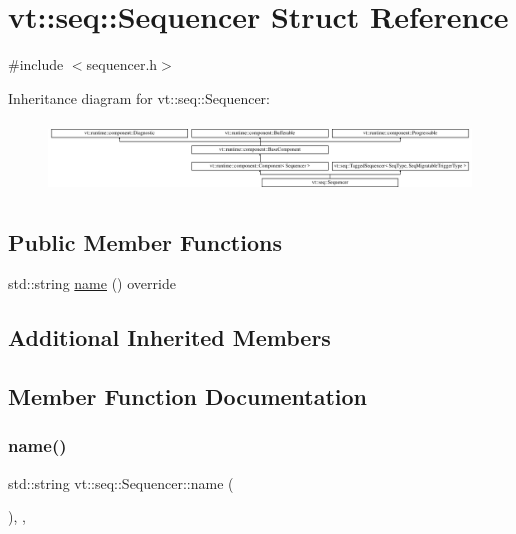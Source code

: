 \hypertarget{structvt_1_1seq_1_1_sequencer}{}\section{vt\+:\+:seq\+:\+:Sequencer Struct Reference}
\label{structvt_1_1seq_1_1_sequencer}


{\ttfamily \#include $<$sequencer.\+h$>$}

Inheritance diagram for vt\+:\+:seq\+:\+:Sequencer\+:\begin{figure}[H]
\begin{center}
\leavevmode
\includegraphics[height=1.885522cm]{structvt_1_1seq_1_1_sequencer}
\end{center}
\end{figure}
\subsection*{Public Member Functions}
\begin{DoxyCompactItemize}
\item 
std\+::string \hyperlink{structvt_1_1seq_1_1_sequencer_a18cbaabd9f1c5bf8d2f6a5c2e4ac5aaa}{name} () override
\end{DoxyCompactItemize}
\subsection*{Additional Inherited Members}


\subsection{Member Function Documentation}
\mbox{\label{structvt_1_1seq_1_1_sequencer_a18cbaabd9f1c5bf8d2f6a5c2e4ac5aaa}} 
\subsubsection{\texorpdfstring{name()}{name()}}
{\footnotesize\ttfamily std\+::string vt\+::seq\+::\+Sequencer\+::name (\begin{DoxyParamCaption}{ }\end{DoxyParamCaption})\hspace{0.3cm}{\ttfamily [inline]}, {\ttfamily [override]}, {\ttfamily [virtual]}}



